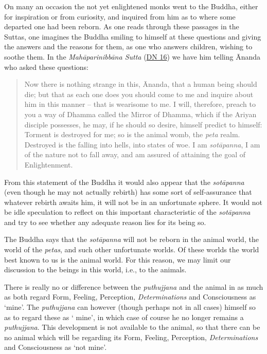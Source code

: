 On many an occasion the not yet enlightened monks went to the Buddha, either for inspiration or from curiosity, and inquired from him as to where some departed one had been reborn. As one reads through these passages in the Suttas, one imagines the Buddha smiling to himself at these questions and giving the answers and the reasons for them, as one who answers children, wishing to soothe them. In the \emph{Mahāparinibbāna Sutta} (\href{https://suttacentral.net/dn16/en/bodhi}{DN 16}) we have him telling Ānanda who asked these questions:

\begin{quote}
Now there is nothing strange in this, Ānanda, that a human being should die; but that as each one does you should come to me and inquire about him in this manner -- that is wearisome to me. I will, therefore, preach to you a way of Dhamma called the Mirror of Dhamma, which if the Ariyan disciple possesses, he may, if he should so desire, himself predict to himself: Torment is destroyed for me; so is the animal womb, the \emph{peta} realm. Destroyed is the falling into hells, into states of woe. I am \emph{sotāpanna}, I am of the nature not to fall away, and am assured of attaining the goal of Enlightenment.
\end{quote}

From this statement of the Buddha it would also appear that the \emph{sotāpanna} (even though he may not actually  rebirth) has some sort of self-assurance that whatever rebirth awaits him, it will not be in an unfortunate sphere. It would not be idle speculation to reflect on this important characteristic of the \emph{sotāpanna} and try to see whether any adequate reason lies for its being so.

The Buddha says that the \emph{sotāpanna} will not be reborn in the animal world, the world of the \emph{petas}, and such other unfortunate worlds. Of these worlds the world best known to us is the animal world. For this reason, we may limit our discussion to the beings in this world, i.e., to the animals.

There is really no  or  difference between the \emph{puthujjana} and the animal in as much as both regard Form, Feeling, Perception, \emph{Determinations} and Consciousness as `mine'. The \emph{puthujjana} can however (though perhaps not in all cases)  himself so as to regard these as ` mine', in which case of course he no longer remains a \emph{puthujjana}. This development is not available to the animal, so that there can be no animal which will be regarding its Form, Feeling, Perception, \emph{Determinations} and Consciousness as `not mine'.

